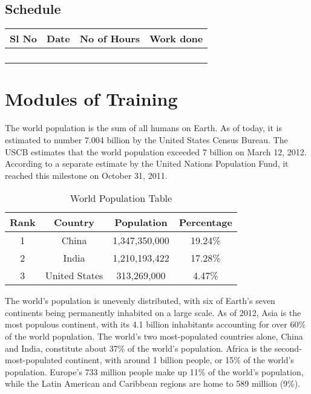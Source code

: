\documentclass{fisattraining}
\begin{document}
\section{Schedule}

\begin{tabular}{|c|c|c|c|}
	\hline Sl No & Date  & No of Hours  & Work done  \\ 
	\hline  &  &  &  \\ 
	\hline  &  &  &  \\ 
	\hline  &  &  &  \\ 
	\hline  &  &  &  \\ 
	\hline 
\end{tabular} 

\chapter{Modules of Training}

The world population is the sum of all humans on Earth. As of today, it is estimated to number 7.004 billion by the United States Census Bureau. The USCB estimates that the world population exceeded 7 billion on March 12, 2012. According to a separate estimate by the United Nations Population Fund, it reached this milestone on October 31, 2011.
\begin{table}[h!]
\begin{center}
\begin{tabular}{|c|c|c|c|}
\hline Rank & Country & Population  & Percentage  \\ 
\hline 1 & China & 1,347,350,000 & 19.24\% \\ 
\hline 2 & India & 1,210,193,422  & 17.28\% \\ 
\hline 3 & United States & 313,269,000 & 4.47\% \\ 
\hline 
\end{tabular}
\caption{World Population Table} 
\end{center}
\end{table}
The world's population is unevenly distributed, with six of Earth's seven continents being permanently inhabited on a large scale. As of 2012, Asia is the most populous continent, with its 4.1 billion inhabitants accounting for over 60\% of the world population. The world's two most-populated countries alone, China and India, constitute about 37\% of the world's population. Africa is the second-most-populated continent, with around 1 billion people, or 15\% of the world's population. Europe's 733 million people make up 11\% of the world's population, while the Latin American and Caribbean regions are home to 589 million (9\%).
\end{document}
